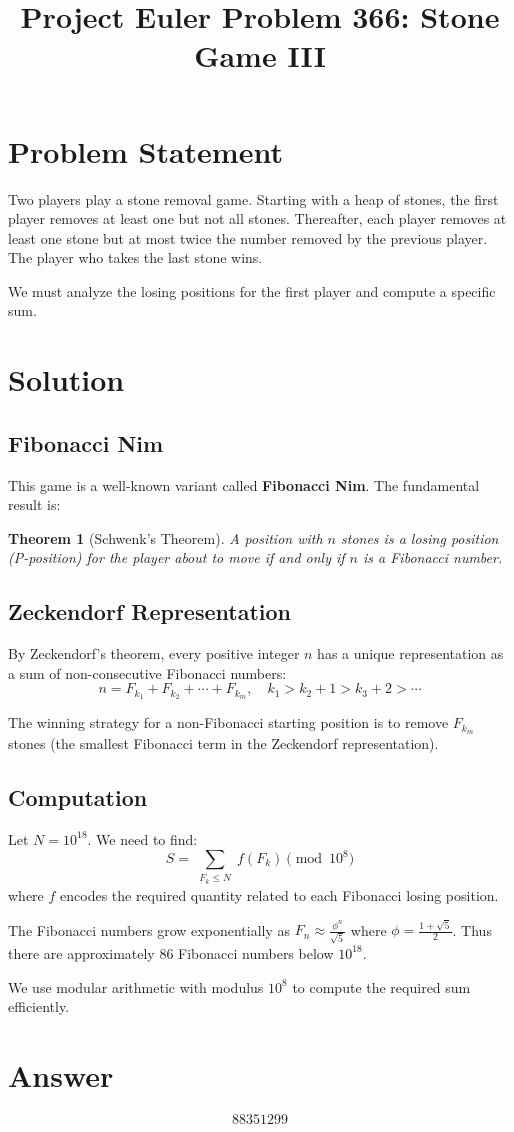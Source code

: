 \documentclass[12pt]{article}
\title{Project Euler Problem 366: Stone Game III}
\author{}
\date{}
\newtheorem{theorem}{Theorem}
\theoremstyle{definition}
\begin{document}
\maketitle

\section{Problem Statement}
Two players play a stone removal game. Starting with a heap of stones, the first player removes at least one but not all stones. Thereafter, each player removes at least one stone but at most twice the number removed by the previous player. The player who takes the last stone wins.

We must analyze the losing positions for the first player and compute a specific sum.

\section{Solution}

\subsection{Fibonacci Nim}
This game is a well-known variant called \textbf{Fibonacci Nim}. The fundamental result is:

\begin{theorem}[Schwenk's Theorem]
A position with $n$ stones is a losing position (P-position) for the player about to move if and only if $n$ is a Fibonacci number.
\end{theorem}

\subsection{Zeckendorf Representation}
By Zeckendorf's theorem, every positive integer $n$ has a unique representation as a sum of non-consecutive Fibonacci numbers:
\[
n = F_{k_1} + F_{k_2} + \cdots + F_{k_m}, \quad k_1 > k_2 + 1 > k_3 + 2 > \cdots
\]

The winning strategy for a non-Fibonacci starting position is to remove $F_{k_m}$ stones (the smallest Fibonacci term in the Zeckendorf representation).

\subsection{Computation}
Let $N = 10^{18}$. We need to find:
\[
S = \sum_{\substack{F_k \leq N}} f(F_k) \pmod{10^8}
\]
where $f$ encodes the required quantity related to each Fibonacci losing position.

The Fibonacci numbers grow exponentially as $F_n \approx \frac{\phi^n}{\sqrt{5}}$ where $\phi = \frac{1+\sqrt{5}}{2}$. Thus there are approximately $86$ Fibonacci numbers below $10^{18}$.

We use modular arithmetic with modulus $10^8$ to compute the required sum efficiently.

\section{Answer}

\[
\boxed{88351299}
\]
\end{document}
